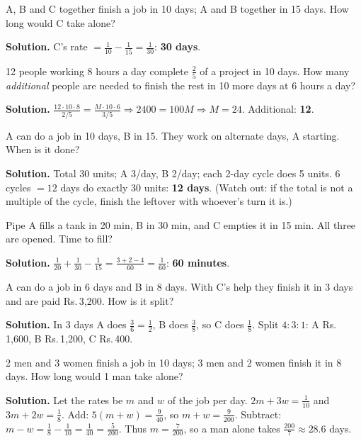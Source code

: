 \documentclass[11pt,a4paper,openany]{report}
\newcommand{\Rs}{Rs.\,}
\begin{document}
\begin{example}
A, B and C together finish a job in 10 days; A and B together in 15 days. How long would C take alone?

\textbf{Solution.} C's rate $=\frac1{10}-\frac1{15}=\frac1{30}$: \textbf{30 days}.
\end{example}

\begin{example}
12 people working 8 hours a day complete $\frac25$ of a project in 10 days. How many \emph{additional} people are needed to
finish the rest in 10 more days at 6 hours a day?

\textbf{Solution.} $\frac{12\cdot10\cdot8}{2/5}=\frac{M\cdot10\cdot6}{3/5}\Rightarrow2400=100M\Rightarrow M=24$. Additional: \textbf{12}.
\end{example}

\begin{example}
A can do a job in 10 days, B in 15. They work on alternate days, A starting. When is it done?

\textbf{Solution.} Total 30 units; A 3/day, B 2/day; each 2-day cycle does 5 units. 6 cycles $=12$ days do exactly 30 units: \textbf{12 days}.
(Watch out: if the total is not a multiple of the cycle, finish the leftover with whoever's turn it is.)
\end{example}

\begin{example}[pipes]
Pipe A fills a tank in 20 min, B in 30 min, and C empties it in 15 min. All three are opened. Time to fill?

\textbf{Solution.} $\frac1{20}+\frac1{30}-\frac1{15}=\frac{3+2-4}{60}=\frac1{60}$: \textbf{60 minutes}.
\end{example}

\begin{example}[wages]
A can do a job in 6 days and B in 8 days. With C's help they finish it in 3 days and are paid \Rs3,200. How is it split?

\textbf{Solution.} In 3 days A does $\frac36=\frac12$, B does $\frac38$, so C does $\frac18$. Split $4:3:1$: A \Rs1,600, B \Rs1,200, C \Rs400.
\end{example}
\begin{example}
2 men and 3 women finish a job in 10 days; 3 men and 2 women finish it in 8 days. How long would 1 man take alone?

\textbf{Solution.} Let the rates be $m$ and $w$ of the job per day. $2m+3w=\frac1{10}$ and $3m+2w=\frac18$. Add: $5(m+w)=\frac9{40}$, so $m+w=\frac9{200}$. Subtract: $m-w=\frac18-\frac1{10}=\frac1{40}=\frac5{200}$. Thus $m=\frac7{200}$, so a man alone takes $\frac{200}7\approx\mathbf{28.6}$ days.
\end{example}
\end{document}
